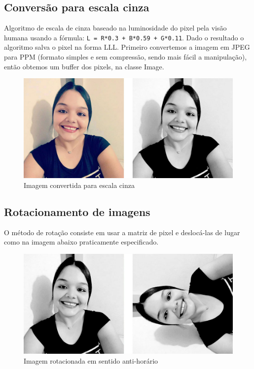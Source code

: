 		\lstset{language=c++}
		{\tiny }
		
	\subsection{Conversão para escala cinza}
		Algoritmo de escala de cinza baseado na luminosidade do pixel pela visão humana usando a fórmula: \texttt{L = R*0.3 + B*0.59 + G*0.11}. Dado o resultado o algoritmo salva o pixel na forma LLL. Primeiro convertemos a imagem em JPEG para PPM (formato simples e sem compressão, sendo mais fácil a manipulação), então obtemos um buffer dos pixels, na classe Image.
		
		\begin{figure}[!htb]
			\centering
			\includegraphics[width=\textwidth]{img/03-cinza.jpg}
			\caption{Imagem convertida para escala cinza}
		\end{figure}
		
		\lstset{language=Python}
		{\tiny }
		
		\subsection{Rotacionamento de imagens}
			O método de rotação consiste em usar a matriz de pixel e deslocá-las de lugar como na imagem abaixo praticamente especificado.
			
			\begin{figure}[!htb]
				\centering
				\includegraphics[width=\textwidth]{img/04-rotacao-1.jpg}
				\caption{Imagem rotacionada em sentido anti-horário}
			\end{figure}
			
